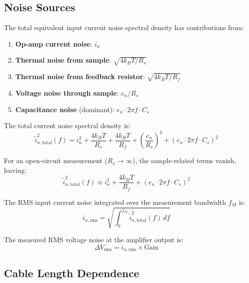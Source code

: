 \documentclass[11pt,a4paper]{article}
\begin{document}
\subsection{Noise Sources}

The total equivalent input current noise spectral density has contributions from:

\begin{enumerate}
  \item \textbf{Op-amp current noise}: $i_n$
  \item \textbf{Thermal noise from sample}: $\sqrt{4 k_B T / R_s}$
  \item \textbf{Thermal noise from feedback resistor}: $\sqrt{4 k_B T / R_f}$
  \item \textbf{Voltage noise through sample}: $e_n / R_s$
  \item \textbf{Capacitance noise} (dominant): $e_n \cdot 2\pi f \cdot C_s$
\end{enumerate}

The total current noise spectral density is:
\begin{equation}
  \tilde{i}_{n,\text{total}}^2(f) = i_n^2 + \frac{4 k_B T}{R_s}
    + \frac{4 k_B T}{R_f}
    + \left(\frac{e_n}{R_s}\right)^2
    + \left(e_n \cdot 2\pi f \cdot C_s\right)^2
  \label{eq:noise_total}
\end{equation}

For an open-circuit measurement ($R_s \to \infty$), the sample-related terms
vanish, leaving:
\begin{equation}
  \tilde{i}_{n,\text{total}}^2(f) \approx i_n^2
    + \frac{4 k_B T}{R_f}
    + \left(e_n \cdot 2\pi f \cdot C_s\right)^2
  \label{eq:noise_open}
\end{equation}

The RMS input current noise integrated over the measurement bandwidth $f_M$ is:
\begin{equation}
  i_{n,\text{rms}} = \sqrt{\int_0^{f_M} \tilde{i}_{n,\text{total}}^2(f)\, df}
\end{equation}

The measured RMS voltage noise at the amplifier output is:
\begin{equation}
  \Delta V_{\text{rms}} = i_{n,\text{rms}} \times \text{Gain}
  \label{eq:Vrms}
\end{equation}

\subsection{Cable Length Dependence}
\end{document}
